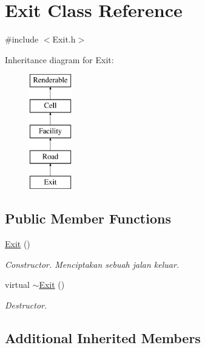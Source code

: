 \hypertarget{classExit}{\section{Exit Class Reference}
\label{classExit}
}


{\ttfamily \#include $<$Exit.\+h$>$}

Inheritance diagram for Exit\+:\begin{figure}[H]
\begin{center}
\leavevmode
\includegraphics[height=5.000000cm]{classExit}
\end{center}
\end{figure}
\subsection*{Public Member Functions}
\begin{DoxyCompactItemize}
\item 
\hypertarget{classExit_a9b2f58ee65af58d03d7004d9fc2ab264}{\hyperlink{classExit_a9b2f58ee65af58d03d7004d9fc2ab264}{Exit} ()}\label{classExit_a9b2f58ee65af58d03d7004d9fc2ab264}

\begin{DoxyCompactList}\small\item\em Constructor. Menciptakan sebuah jalan keluar. \end{DoxyCompactList}\item 
\hypertarget{classExit_adf66e70ca988ae2fe7e74ef256d8612a}{virtual \hyperlink{classExit_adf66e70ca988ae2fe7e74ef256d8612a}{$\sim$\+Exit} ()}\label{classExit_adf66e70ca988ae2fe7e74ef256d8612a}

\begin{DoxyCompactList}\small\item\em Destructor. \end{DoxyCompactList}\end{DoxyCompactItemize}
\subsection*{Additional Inherited Members}


